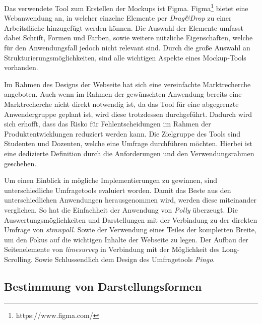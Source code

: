 Das verwendete Tool zum Erstellen der Mockups ist Figma.
Figma\footnote{https://www.figma.com/} bietet eine Webanwendung an, in welcher einzelne Elemente per \emph{Drag\&Drop} zu einer Arbeitsfläche hinzugefügt werden können.
Die Auswahl der Elemente umfasst dabei Schrift, Formen und Farben, sowie weitere nützliche Eigenschaften, welche für den Anwendungsfall jedoch nicht relevant sind.
Durch die große Auswahl an Strukturierungsmöglichkeiten, sind alle wichtigen Aspekte eines Mockup-Tools vorhanden.

Im Rahmen des Designs der Webseite hat sich eine vereinfachte Marktrecherche angeboten. 
Auch wenn im Rahmen der gewünschten Anwendung bereits eine Marktrecherche nicht direkt notwendig ist, da das Tool für eine abgegrenzte Anwendergruppe geplant ist, wird diese trotzdessen durchgeführt. 
Dadurch wird sich erhofft, dass das Risko für Fehlentscheidungen im Rahmen der Produktentwicklungen reduziert werden kann.\autocite{Pioch2019}
Die Zielgruppe des Tools sind Studenten und Dozenten, welche eine Umfrage durchführen möchten. 
Hierbei ist eine dedizierte Definition durch die Anforderungen und den Verwendungsrahmen geschehen. 

Um einen Einblick in mögliche Implementierungen zu gewinnen, sind unterschiedliche Umfragetools evaluiert worden. 
Damit das Beste aus den unterschiedlichen Anwendungen herausgenommen wird, werden diese miteinander verglichen.
So hat die Einfachheit der Anwendung von \emph{Polly} überzeugt.
Die Auswertungsmöglichkeiten und Darstellungen mit der Verbindung zu der direkten Umfrage von \emph{strawpoll}. 
Sowie der Verwendung eines Teiles der kompletten Breite, um den Fokus auf die wichtigen Inhalte der Webseite zu legen. 
Der Aufbau der Seitenelemente von \emph{limesurvey} in Verbindung mit der Möglichkeit des Long-Scrolling.
Sowie Schlussendlich dem Design des Umfragetools \emph{Pingo}.  

\subsection{Bestimmung von Darstellungsformen}